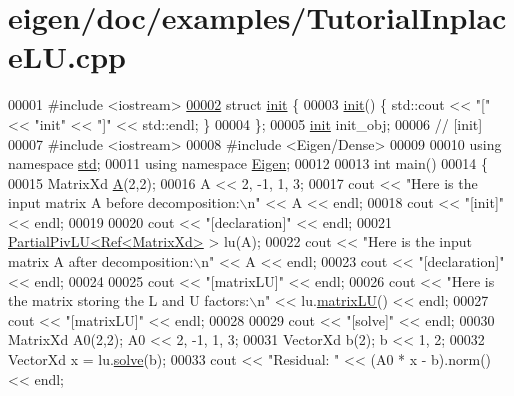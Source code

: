 \hypertarget{eigen_2doc_2examples_2_tutorial_inplace_l_u_8cpp_source}{}\section{eigen/doc/examples/\+Tutorial\+Inplace\+LU.cpp}
\label{eigen_2doc_2examples_2_tutorial_inplace_l_u_8cpp_source}

\begin{DoxyCode}
00001 \textcolor{preprocessor}{#include <iostream>}
\hyperlink{structinit}{00002} \textcolor{keyword}{struct }\hyperlink{structinit}{init} \{
00003   \hyperlink{structinit}{init}() \{ std::cout << \textcolor{stringliteral}{"["} << \textcolor{stringliteral}{"init"} << \textcolor{stringliteral}{"]"} << std::endl; \}
00004 \};
00005 \hyperlink{structinit}{init} init\_obj;
00006 \textcolor{comment}{// [init]}
00007 \textcolor{preprocessor}{#include <iostream>}
00008 \textcolor{preprocessor}{#include <Eigen/Dense>}
00009 
00010 \textcolor{keyword}{using namespace }\hyperlink{namespacestd}{std};
00011 \textcolor{keyword}{using namespace }\hyperlink{namespace_eigen}{Eigen};
00012 
00013 \textcolor{keywordtype}{int} main()
00014 \{
00015   MatrixXd \hyperlink{group___core___module_class_eigen_1_1_matrix}{A}(2,2);
00016   A << 2, -1, 1, 3;
00017   cout << \textcolor{stringliteral}{"Here is the input matrix A before decomposition:\(\backslash\)n"} << A << endl;
00018 cout << \textcolor{stringliteral}{"[init]"} << endl;
00019 
00020 cout << \textcolor{stringliteral}{"[declaration]"} << endl;
00021   \hyperlink{group___l_u___module_class_eigen_1_1_partial_piv_l_u}{PartialPivLU<Ref<MatrixXd>} > lu(A);
00022   cout << \textcolor{stringliteral}{"Here is the input matrix A after decomposition:\(\backslash\)n"} << A << endl;
00023 cout << \textcolor{stringliteral}{"[declaration]"} << endl;
00024 
00025 cout << \textcolor{stringliteral}{"[matrixLU]"} << endl;
00026   cout << \textcolor{stringliteral}{"Here is the matrix storing the L and U factors:\(\backslash\)n"} << lu.\hyperlink{group___l_u___module_abea0d7e51c5591a6db152eade0892d9c}{matrixLU}() << endl;
00027 cout << \textcolor{stringliteral}{"[matrixLU]"} << endl;
00028 
00029 cout << \textcolor{stringliteral}{"[solve]"} << endl;
00030   MatrixXd A0(2,2); A0 << 2, -1, 1, 3;
00031   VectorXd b(2);    b << 1, 2;
00032   VectorXd x = lu.\hyperlink{group___l_u___module_a49247bd2f742a46bca1f9c2bf1b19ad8}{solve}(b);
00033   cout << \textcolor{stringliteral}{"Residual: "} << (A0 * x - b).norm() << endl;

\end{DoxyCode}
